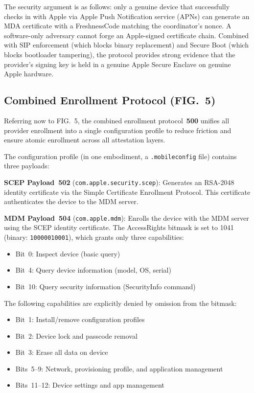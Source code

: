 \documentclass[11pt,letterpaper]{article}
\begin{document}
The security argument is as follows: only a genuine device that successfully checks in with Apple via Apple Push Notification service (APNs) can generate an MDA certificate with a FreshnessCode matching the coordinator's nonce. A software-only adversary cannot forge an Apple-signed certificate chain. Combined with SIP enforcement (which blocks binary replacement) and Secure Boot (which blocks bootloader tampering), the protocol provides strong evidence that the provider's signing key is held in a genuine Apple Secure Enclave on genuine Apple hardware.

\subsection{Combined Enrollment Protocol (FIG.~5)}

Referring now to FIG.~5, the combined enrollment protocol~\textbf{500} unifies all provider enrollment into a single configuration profile to reduce friction and ensure atomic enrollment across all attestation layers.

The configuration profile (in one embodiment, a \texttt{.mobileconfig} file) contains three payloads:

\textbf{SCEP Payload~502} (\texttt{com.apple.security.scep}): Generates an RSA-2048 identity certificate via the Simple Certificate Enrollment Protocol. This certificate authenticates the device to the MDM server.

\textbf{MDM Payload~504} (\texttt{com.apple.mdm}): Enrolls the device with the MDM server using the SCEP identity certificate. The AccessRights bitmask is set to 1041 (binary: \texttt{10000010001}), which grants only three capabilities:
\begin{itemize}[nosep]
\item Bit~0: Inspect device (basic query)
\item Bit~4: Query device information (model, OS, serial)
\item Bit~10: Query security information (SecurityInfo command)
\end{itemize}

The following capabilities are explicitly denied by omission from the bitmask:
\begin{itemize}[nosep]
\item Bit~1: Install/remove configuration profiles
\item Bit~2: Device lock and passcode removal
\item Bit~3: Erase all data on device
\item Bits~5--9: Network, provisioning profile, and application management
\item Bits~11--12: Device settings and app management
\end{itemize}
\end{document}
